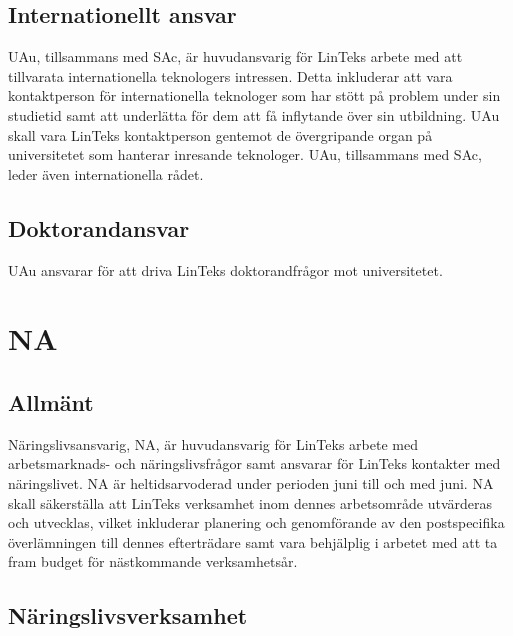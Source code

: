 \hypertarget{internationellt-ansvar-2}{%
\subsection{Internationellt ansvar}\label{internationellt-ansvar-2}}

UAu, tillsammans med SAc, är huvudansvarig för LinTeks arbete med att
tillvarata internationella teknologers intressen. Detta inkluderar att
vara kontaktperson för internationella teknologer som har stött på
problem under sin studietid samt att underlätta för dem att få
inflytande över sin utbildning. UAu skall vara LinTeks kontaktperson
gentemot de övergripande organ på universitetet som hanterar inresande
teknologer. UAu, tillsammans med SAc, leder även internationella rådet.

\hypertarget{doktorandansvar-1}{%
\subsection{Doktorandansvar}\label{doktorandansvar-1}}

UAu ansvarar för att driva LinTeks doktorandfrågor mot universitetet.

\hypertarget{na}{%
\section{NA}\label{na}}

\hypertarget{allmuxe4nt-4}{%
\subsection{Allmänt}\label{allmuxe4nt-4}}

Näringslivsansvarig, NA, är huvudansvarig för LinTeks arbete med
arbetsmarknads- och näringslivsfrågor samt ansvarar för LinTeks
kontakter med näringslivet. NA är heltidsarvoderad under perioden juni
till och med juni. NA skall säkerställa att LinTeks verksamhet inom
dennes arbetsområde utvärderas och utvecklas, vilket inkluderar
planering och genomförande av den postspecifika överlämningen till
dennes efterträdare samt vara behjälplig i arbetet med att ta fram
budget för nästkommande verksamhetsår.

\hypertarget{nuxe4ringslivsverksamhet}{%
\subsection{Näringslivsverksamhet}\label{nuxe4ringslivsverksamhet}}

